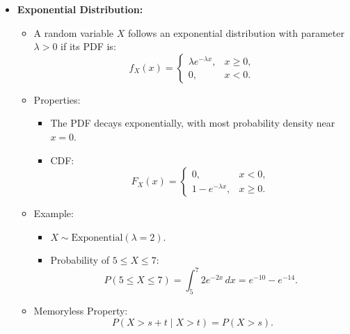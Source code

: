 \documentclass{article}
\begin{document}
\begin{itemize}
  \item \textbf{Exponential Distribution:}
    \begin{itemize}
      \item A random variable $X$ follows an exponential distribution with parameter $\lambda > 0$ if its PDF is:
        \[
          f_X(x) =
          \begin{cases}
            \lambda e^{-\lambda x}, & x \geq 0, \\
            0, & x < 0.
          \end{cases}
        \]
      \item Properties:
        \begin{itemize}
          \item The PDF decays exponentially, with most probability density near $x = 0$.
          \item CDF:
            \[
              F_X(x) =
              \begin{cases}
                0, & x < 0, \\
                1 - e^{-\lambda x}, & x \geq 0.
              \end{cases}
            \]
        \end{itemize}
      \item Example:
        \begin{itemize}
          \item $X \sim \text{Exponential}(\lambda=2)$.
          \item Probability of $5 \leq X \leq 7$:
            \[
              P(5 \leq X \leq 7) = \int_5^7 2e^{-2x} \, dx = e^{-10} - e^{-14}.
            \]
        \end{itemize}
      \item Memoryless Property:
        \[
          P(X > s + t \mid X > t) = P(X > s).
        \]
    \end{itemize}


\end{itemize}
\end{document}
